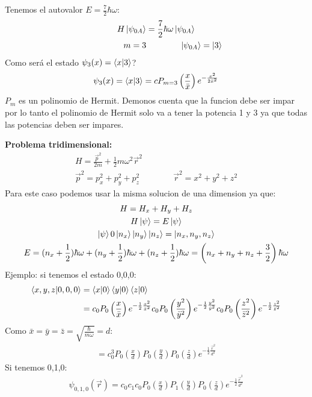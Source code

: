 \documentclass{article}
\begin{document}
\hfill 

\hfill

Tenemos el autovalor $ E = \frac{7 }{2} \hbar  \omega $:
\begin{gather*}
  H \ket{\psi_{0A }} = \frac{7 }{2} \hbar \omega \ket{\psi _{0 A } }\\
  \qquad \qquad m = 3 \qquad \qquad \ket{\psi _{0 A } } = \ket{3 } 
\end{gather*}
Como será el estado $ \psi_3 (x) = \bra{x }\ket{3 }  $?
\begin{gather*}
  \psi_3 (x) = \bra{x }\ket{3 }  = c P_{m = 3}\left(\frac{x }{\bar x}\right) e ^ {- \frac{x ^2}{2 \bar x ^2}}
\end{gather*}
$ P_m  $ es un polinomio de Hermit. Demonos cuenta que la funcion debe ser impar por lo tanto el polinomio de Hermit solo va a tener la potencia 1 y 3 ya que todas las potencias deben ser impares.

\textbf{Problema tridimensional: }
\begin{gather*}
  H = \frac{\vec p ^2}{2m } + \frac{1}{2} m \omega ^2 \vec r ^2\\
  \vec p ^2 = p_x ^2 + p _{y } ^2 + p _{z }  ^2\qquad \qquad \vec r ^2 = x ^2 + y ^2 + z ^2
\end{gather*}
Para este caso podemos usar la misma solucion de una dimension ya que: 
\begin{gather*}
  H = H_x + H_y + H_z \\
  H \ket{\psi} = E \ket{\psi}\\
  \ket{\psi} 0 \ket{n_x }\ket{n_y }\ket{n_z } = \ket{n_x,n_y,n_z }\\
  E = (n_x + \frac{1}{2}) \hbar  \omega + (n_y + \frac{1}{2}) \hbar  \omega + (n_z + \frac{1}{2}) \hbar \omega = \left(n_x + n_y + n_z + \frac{3 }{2}\right) \hbar \omega
\end{gather*}
Ejemplo: si tenemos el estado 0,0,0: 
\begin{align*}
  \bra{x,y,z }\ket{0,0,0 } &= \bra{x }\ket{0 }\bra{y }\ket{0 }\bra{z }\ket{0 }     \\
                           &= c_0P_0 \left(\frac{x }{\bar x }\right)e ^ {- \frac{1 }{2} \frac{x ^2 }{\bar x ^2 }} c_0 P_0\left(\frac{y ^2 }{\bar y ^2 }\right) e ^ {- \frac{1}{2} \frac{y ^2 }{\bar y ^2 }} c_0 P_0 \left(\frac{z ^2 }{\bar z ^2 } \right) e ^ {- \frac{1}{2}\frac{z ^2 }{\bar z ^2 }}
\end{align*}
Como $ \bar x = \bar y = \bar z = \sqrt{\frac{\hbar }{m \omega}} = d  $: 
\begin{gather*}
  = c_0^3 P_0 \left(\frac{x }{d }\right)P_0 \left(\frac{y }{d }\right)P_0 \left(\frac{z }{d }\right) e ^ {- \frac{1}{2} \frac{\vec r ^2}{d ^2}} 
\end{gather*}
Si tenemos 0,1,0:
\begin{gather*}
  \psi _{0,1,0 } (\vec r ) = c_0 c_1 c_0 P_0 \left(\frac{x }{d }\right)P_1 \left(\frac{y }{d }\right)P_0 \left(\frac{z }{d }\right) e ^ {- \frac{1}{2} \frac{\vec r ^2}{d ^2}}
\end{gather*}
\end{document}
